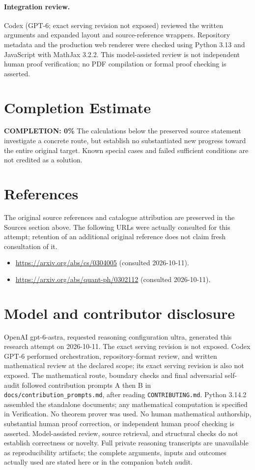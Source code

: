 \documentclass[11pt]{article}
\begin{document}
\paragraph{Integration review.} Codex (GPT-6; exact serving revision not exposed) reviewed the written arguments and expanded layout and source-reference wrappers. Repository metadata and the production web renderer were checked using Python 3.13 and JavaScript with MathJax 3.2.2. This model-assisted review is not independent human proof verification; no PDF compilation or formal proof checking is asserted.

\section{Completion Estimate}
\noindent\textbf{COMPLETION: 0\%}
The calculations below the preserved source statement investigate a concrete route,
but establish no substantiated new progress toward the entire original target.
Known special cases and failed sufficient conditions are not credited as a solution.
\section{References}
The original source references and catalogue attribution are preserved in the
Sources section above. The following URLs were actually consulted for this attempt;
retention of an additional original reference does not claim fresh consultation of it.
\begin{itemize}
\item \url{https://arxiv.org/abs/cs/0304005} (consulted 2026-10-11). 
\item \url{https://arxiv.org/abs/quant-ph/0302112} (consulted 2026-10-11). 
\end{itemize}
\section{Model and contributor disclosure}
OpenAI gpt-6-astra, requested reasoning configuration ultra, generated this research
attempt on 2026-10-11. The exact serving revision is not exposed. Codex GPT-6
performed orchestration, repository-format review, and written mathematical review at the declared scope; its exact serving revision
is also not exposed. The mathematical route, boundary checks and final adversarial
self-audit followed contribution prompts A then B in
\texttt{docs/contribution\_prompts.md}, after reading \texttt{CONTRIBUTING.md}.
Python 3.14.2 assembled the standalone documents; any mathematical computation is
specified in Verification. No theorem prover was used. No human mathematical
authorship, substantial human proof correction, or independent human proof checking
is asserted. Model-assisted review, source retrieval, and structural checks do not
establish correctness or novelty. Full private reasoning transcripts are unavailable
as reproducibility artifacts; the complete arguments, inputs and outcomes actually
used are stated here or in the companion batch audit.
\end{document}
